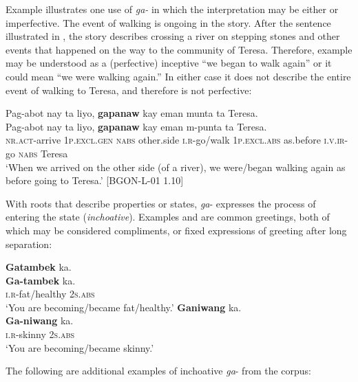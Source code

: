 Example  illustrates one use of \textit{ga-} in which the interpretation may be either  or imperfective. The event of walking is ongoing in the story. After the sentence illustrated in , the story describes crossing a river on stepping stones and other events that happened on the way to the community of Teresa. Therefore, example  may be understood as a (perfective) inceptive “we began to walk again” or it could mean “we were walking again.” In either case it does not describe the entire event of walking to Teresa, and therefore is not perfective:

\largerpage[2]
\ea
\label{bkm:Ref396718461}
Pag-abot  nay  ta  liyo,  \textbf{gapanaw} kay eman  munta  ta  Teresa. \\\smallskip
 \gll Pag-abot  nay  ta  liyo,  \textbf{gapanaw} kay eman  m-punta  ta  Teresa. \\
\textsc{nr.act}-arrive  1\textsc{p.excl.gen}  \textsc{nabs}  other.side  \textsc{i.r}-go/walk  1\textsc{p.excl.abs}
as.before  \textsc{i.v.ir}-go  \textsc{nabs}  Teresa \\
\glt `When we arrived on the other side (of a river), we were/began walking again as before going to Teresa.’ [BGON-L-01 1.10]
\z

With roots that describe properties or states, \textit{ga}{}- expresses the process of entering the state (\textit{inchoative}). Examples  and  are common greetings, both of which may be considered compliments, or fixed expressions of greeting after long separation:

\ea
\label{bkm:Ref119937645}
\textbf{Gatambek} ka. \\\smallskip
 \gll \textbf{Ga-tambek}  ka. \\
\textsc{i.r}-fat/healthy  2\textsc{s.abs} \\
\glt ‘You are becoming/became fat/healthy.’
\z
\ea
\label{bkm:Ref416513591}
\textbf{Ganiwang}  ka. \\\smallskip
 \gll \textbf{Ga-niwang}  ka. \\
\textsc{i.r}-skinny  2\textsc{s.abs} \\
\glt ‘You are becoming/became skinny.’
\z

The following are additional examples of inchoative \textit{ga}- from the corpus:


